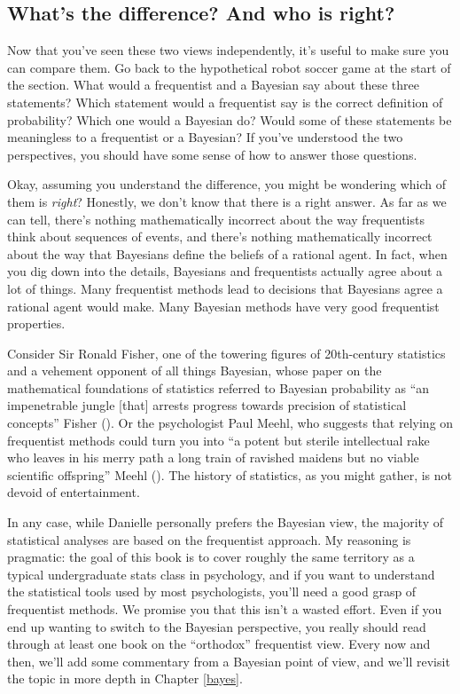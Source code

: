 \documentclass[
  11pt,
  a4paper,
  twoside,symmetric,openright]{book}
\theoremstyle{break}
\theoremstyle{break}
\begin{document}
\subsection{What's the difference? And who is right?}\label{whats-the-difference-and-who-is-right}

Now that you've seen these two views independently, it's useful to make sure you can compare them. Go back to the hypothetical robot soccer game at the start of the section. What would a frequentist and a Bayesian say about these three statements? Which statement would a frequentist say is the correct definition of probability? Which one would a Bayesian do? Would some of these statements be meaningless to a frequentist or a Bayesian? If you've understood the two perspectives, you should have some sense of how to answer those questions.

Okay, assuming you understand the difference, you might be wondering which of them is \emph{right}? Honestly, we don't know that there is a right answer. As far as we can tell, there's nothing mathematically incorrect about the way frequentists think about sequences of events, and there's nothing mathematically incorrect about the way that Bayesians define the beliefs of a rational agent. In fact, when you dig down into the details, Bayesians and frequentists actually agree about a lot of things. Many frequentist methods lead to decisions that Bayesians agree a rational agent would make. Many Bayesian methods have very good frequentist properties.

Consider Sir Ronald Fisher, one of the towering figures of 20th-century statistics and a vehement opponent of all things Bayesian, whose paper on the mathematical foundations of statistics referred to Bayesian probability as ``an impenetrable jungle {[}that{]} arrests progress towards precision of statistical concepts'' Fisher (). Or the psychologist Paul Meehl, who suggests that relying on frequentist methods could turn you into ``a potent but sterile intellectual rake who leaves in his merry path a long train of ravished maidens but no viable scientific offspring'' Meehl (). The history of statistics, as you might gather, is not devoid of entertainment.

In any case, while Danielle personally prefers the Bayesian view, the majority of statistical analyses are based on the frequentist approach. My reasoning is pragmatic: the goal of this book is to cover roughly the same territory as a typical undergraduate stats class in psychology, and if you want to understand the statistical tools used by most psychologists, you'll need a good grasp of frequentist methods. We promise you that this isn't a wasted effort. Even if you end up wanting to switch to the Bayesian perspective, you really should read through at least one book on the ``orthodox'' frequentist view. Every now and then, we'll add some commentary from a Bayesian point of view, and we'll revisit the topic in more depth in Chapter \ref{bayes}.
\end{document}
